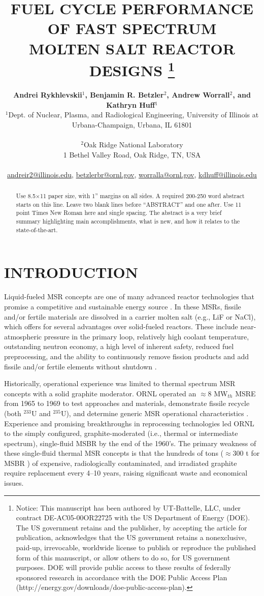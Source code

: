 \documentclass[letterpaper]{mandc2019}
\title{FUEL CYCLE PERFORMANCE OF FAST SPECTRUM \\
  MOLTEN SALT REACTOR DESIGNS
\footnote{Notice:  This manuscript has been authored by UT-Battelle, LLC, under contract DE-AC05-00OR22725 with the US Department of Energy (DOE). The US government retains and the publisher, by accepting the article for publication, acknowledges that the US government retains a nonexclusive, paid-up, irrevocable, worldwide license to publish or reproduce the published form of this manuscript, or allow others to do so, for US government purposes. DOE will provide public access to these results of federally sponsored research in accordance with the DOE Public Access Plan (http://energy.gov/downloads/doe-public-access-plan).}
		}
\author{%
  \textbf{Andrei Rykhlevskii$^1$, Benjamin R. Betzler$^2$, Andrew Worrall$^2$, and Kathryn Huff$^1$} \\
  $^1$Dept. of Nuclear, Plasma, and Radiological Engineering, University of Illinois at \\
  Urbana-Champaign, Urbana, IL 61801 \\
\\
  $^2$Oak Ridge National Laboratory \\
1 Bethel Valley Road, Oak Ridge, TN, USA  \\
\\
  \url{andreir2@illinois.edu}, \url{betzlerbr@ornl.gov}, \url{worralla@ornl.gov}, \url{kdhuff@illinois.edu}
}
\begin{document}
\maketitle
\justify

\begin{abstract}
  Use 8.5$\times$11 paper size, with 1'' margins on all sides.  A required 200-250
  word abstract starts on this line.  Leave two blank lines before ``ABSTRACT''
  and one after.  Use 11 point Times New Roman here and single
  spacing. The abstract is a very brief summary highlighting main
  accomplishments, what is new, and how it relates to the state-of-the-art.
\end{abstract}

\section{INTRODUCTION}
\label{sec:intro}
Liquid-fueled \gls{MSR} concepts are one of many advanced reactor technologies that promise a competitive and sustainable energy source \cite{siemer_why_2015}. In these \gls{MSR}s, fissile and/or fertile materials are dissolved in a carrier molten salt (e.g., LiF or NaCl), which offers for several advantages over solid-fueled reactors. These include near-atmospheric pressure in the primary loop, relatively high coolant temperature, outstanding neutron economy, a high level of inherent safety,
reduced fuel preprocessing, and the ability to continuously remove fission products and add fissile and/or fertile elements without shutdown \cite{leblanc_molten_2010}.

Historically, operational experience was limited to thermal spectrum \gls{MSR} concepts with a solid graphite moderator.  \gls{ORNL} operated an $\approx$8 MW$_{th}$ \gls{MSRE} from 1965 to 1969 to test approaches and materials, demonstrate fissile recycle (both $^{233}$U and $^{235}$U), and determine generic \gls{MSR} operational characteristics \cite{macpherson_molten_1985}. Experience and promising breakthroughs in reprocessing technologies \cite{whatley_engineering_1970} led \gls{ORNL} to the simply configured, graphite-moderated (i.e., thermal or intermediate spectrum), single-fluid \gls{MSBR} by the end of the 1960's. The primary weakness of these single-fluid thermal \gls{MSR} concepts is that the hundreds of tons ($\approx$300 t for \gls{MSBR} \cite{robertson_conceptual_1971}) of expensive, radiologically contaminated, and irradiated graphite require replacement every 4--10 years, raising significant waste and economical issues.
\end{document}
